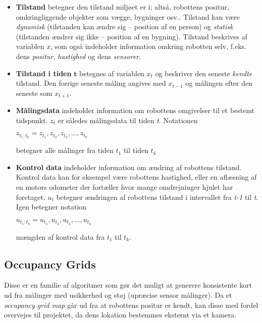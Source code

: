 \begin{itemize}
\item \textbf{Tilstand} betegner den tilstand miljøet er i; altså, robottens positur, omkringliggende objekter som vægge, bygninger osv.. 
Tilstand kan være \textit{dynamisk} (tilstanden kan ændre sig -- position af en person) og \textit{statisk} (tilstanden ændrer sig ikke -- position af en bygning).
Tilstand beskrives af variablen $x$, som også indeholder information omkring robotten selv, f.eks. dens \textit{positur}, \textit{hastighed} og dens \textit{sensorer}.

\item \textbf{Tilstand i tiden} $\mathbf{t}$ betegnes af variablen $x_t$ og beskriver den seneste \textit{kendte} tilstand. 
Den forrige seneste måling angives med $x_{t-1}$ og målingen efter den seneste som $x_{t+1}$.

\item \textbf{Målingsdata} indeholder information om robottens omgivelser til et bestemt tidspunkt. 
$z_t$ er således målingsdata til tiden \textit{t}. 
Notationen

$z_{t_1:t_k} = z_{t_1}, z_{t_2}, z_{t_3}, \dots , z_{t_k}$

betegner alle målinger fra tiden \textit{$ t_1 $} til tiden \textit{$ t_k $}
\item \textbf{Kontrol data} indeholder information om ændring af robottens tilstand. 
Kontrol data kan for eksempel være robottens hastighed, eller en aflæsning af en motors odometer der fortæller hvor mange omdrejninger hjulet har foretaget.
$u_t$ betegner ændringen af robottens tilstand i intervallet fra \textit{t-1} til \textit{t}.
Igen betegner notation

$u_{t_1:t_k} = u_{t_1}, u_{t_2}, u_{t_3}, \dots , u_{t_k}$

mængden af kontrol data fra \textit{$ t_1 $} til \textit{$ t_k $}.
\end{itemize}


\subsection{Occupancy Grids}\label{mapping:occupancy_grid}
Disse er en familie af algoritmer som gør det muligt at generere konsistente kort ud fra målinger med usikkerhed og støj (upræcise sensor målinger).
Da et \textit{occupancy grid map} går ud fra at robottens positur er kendt, kan disse med fordel overvejes til projektet, da dens lokation bestemmes eksternt via et kamera. \cite[s.~224]{probabilisticRobotics}

